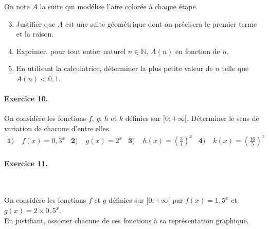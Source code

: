 \documentclass[11pt]{article}
\begin{document}
On note $A$ la suite qui modélise l'aire colorée à chaque étape.
  \begin{enumerate}
      \setcounter{enumi}{2}
    \item Justifier que $A$ est une suite géométrique dont on précisera le premier
      terme et la raison.
    \item Exprimer, pour tout entier naturel $n\in\mathbb{N}$, $A(n)$ en
      fonction de $n$.
    \item En utilisant la calculatrice, déterminer la plus petite valeur de $n$
      telle que $A(n)<0,1$.
  \end{enumerate}

\paragraph{Exercice 10.} On considère les fonctions $f$, $g$, $h$ et $k$
définies sur $[0; +\infty[$. Déterminer le sens de variation de chacune d'entre
elles.
\begin{align*}
  \textbf{1)}\;& f(x)=0,3^x &
  \textbf{2)}\;& g(x)=2^x &
  \textbf{3)}\;& h(x)=\left( \frac{3}{4} \right)^x &
  \textbf{4)}\;& k(x)= \left( \frac{16}{5} \right)^x
\end{align*}

\paragraph{Exercice 11.}~\\[-7mm]
\begin{minipage}{.6\textwidth}
  On considère les fonctions $f$ et $g$ définies sur $[0;+\infty[$ par
    $f(x)=1,5^x$ et $g(x)=2\times0,5^x$.\\
    En justifiant, associer chacune de ces fonctions à sa représentation
    graphique.
\end{minipage}
\begin{minipage}{.4\textwidth}
\begin{center}
\end{center}
\end{minipage}
\end{document}

